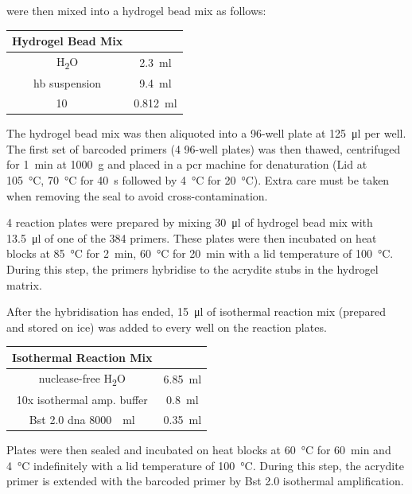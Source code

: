 \begin{appendix}
\begin{multicols}{2}
 were then mixed into a hydrogel bead mix as follows:\pms

\begin{center}
\begin{tabular}{c|c}
\centering
	Hydrogel Bead Mix & \\
	\hline
	H\textsubscript{2}O & \SI{2.3}{\ml} \\
	\acrshort{hb} suspension & \SI{9.4}{\ml} \\
	\SI{10}{\milli\molar} \acrshortpl{dntp} & \SI{0.812}{\ml} \\
\end{tabular}
\end{center}
\medskip

The hydrogel bead mix was then aliquoted into a 96-well plate at \SI{125}{\ul} per well. The first set of barcoded primers (4 96-well plates) was then thawed, centrifuged for \SI{1}{\minute} at \SI{1000}{\g} and placed in a \acrshort{pcr} machine for denaturation (Lid at \SI{105}{\celsius}, \SI{70}{\celsius} for \SI{40}{\s} followed by \SI{4}{\celsius} for \SI{20}{\celsius}). Extra care must be taken when removing the seal to avoid cross-contamination.\pms

4 reaction plates were prepared by mixing \SI{30}{\ul} of hydrogel bead mix with \SI{13.5}{\ul} of one of the 384 primers. These plates were then incubated on heat blocks at \SI{85}{\celsius} for \SI{2}{\minute}, \SI{60}{\celsius} for \SI{20}{\minute} with a lid temperature of \SI{100}{\celsius}. During this step, the primers hybridise to the acrydite stubs in the hydrogel matrix.\pms

After the hybridisation has ended, \SI{15}{\ul} of isothermal reaction mix (prepared and stored on ice) was added to every well on the reaction plates.\pms

\begin{center}
\begin{tabular}{c|c}
\centering
	Isothermal Reaction Mix & \\
	\hline
	nuclease-free H\textsubscript{2}O & \SI{6.85}{\ml} \\
	10x isothermal amp. buffer & \SI{0.8}{\ml} \\
	Bst 2.0 \acrshort{dna} \SI{8000}{\unit\per\ml} & \SI{0.35}{\ml} \\
\end{tabular}
\end{center}
\medskip

Plates were then sealed and incubated on heat blocks at \SI{60}{\celsius} for \SI{60}{\minute} and \SI{4}{\celsius} indefinitely with a lid temperature of \SI{100}{\celsius}. During this step, the acrydite primer is extended with the barcoded primer by Bst 2.0 isothermal amplification.\pms


\end{multicols}
\end{appendix}
